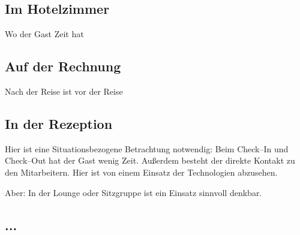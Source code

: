 \subsection{Im Hotelzimmer}
Wo der Gast Zeit hat

\subsection{Auf der Rechnung}
Nach der Reise ist vor der Reise

\subsection{In der Rezeption}

Hier ist eine Situationsbezogene Betrachtung notwendig: Beim Check--In und Check--Out hat der Gast wenig Zeit. Außerdem besteht der direkte Kontakt zu den Mitarbeitern. Hier ist von einem Einsatz der Technologien abzusehen.

Aber: In der Lounge oder Sitzgruppe ist ein Einsatz sinnvoll denkbar.

\subsection{...}

